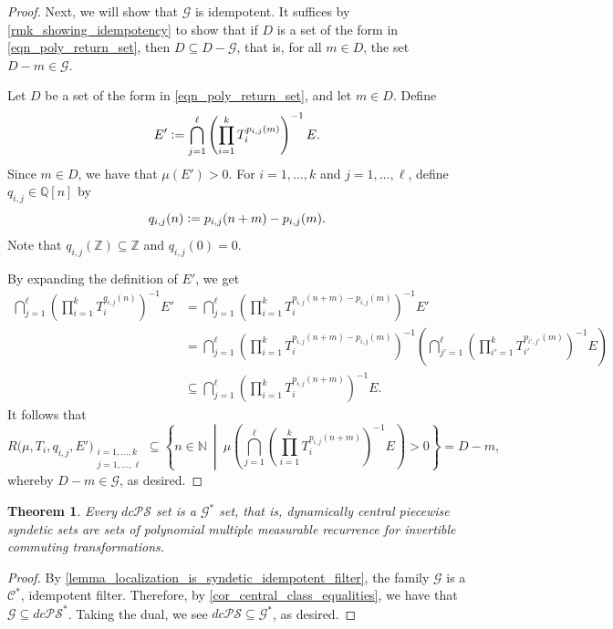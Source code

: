 \documentclass[letter,11pt]{article}
\theoremstyle{plain}
\newtheorem{theorem}{Theorem}
\theoremstyle{definition}
\theoremstyle{plain}
\theoremstyle{plain}
\numberwithin{equation}{section}
\newcommand{\N}{\mathbb{N}}
\newcommand{\Z}{\mathbb{Z}}
\newcommand{\Q}{\mathbb{Q}}
\newcommand{\defeq}{\vcentcolon=}
\newcommand{\dcPS}{dc\mathcal{PS}}
\newcommand{\central}{\mathcal{C}}
\newcommand{\filtertwo}{\mathscr{G}}
\newcommand{\familytwo}{\mathscr{G}}
\newcommand{\polyret}{R}
\begin{document}
\begin{proof}
    
    
    Next, we will show that $\filtertwo$ is idempotent. It suffices by \cref{rmk_showing_idempotency} to show that if $D$ is a set of the form in \eqref{eqn_poly_return_set}, then $D \subseteq D - \filtertwo$, that is, for all $m \in D$, the set $D-m \in \filtertwo$.
    
    Let $D$ be a set of the form in \eqref{eqn_poly_return_set}, and let $m \in D$.
    Define
    \[
        E' \defeq \bigcap_{j=1}^{\ell} \left( \prod_{i=1}^{k} T_i^{p_{i,j}(m)} \right)^{-1} E.
    \]
    Since $m \in D$, we have that $\mu(E') > 0$. For $i = 1, \ldots, k$ and $j = 1, \ldots, \ell$, define $q_{i,j} \in \Q[n]$ by
    \[
        q_{i,j}(n) \defeq p_{i,j}(n + m) - p_{i,j}(m).
    \]
    Note that $q_{i,j}(\Z) \subseteq \Z$ and $q_{i,j}(0) = 0$.

    By expanding the definition of $E'$, we get
    \begin{align*}
        \bigcap_{j=1}^{\ell} \left( \prod_{i=1}^{k} T_i^{q_{i,j}(n)} \right)^{-1} E' &= \bigcap_{j=1}^{\ell} \left( \prod_{i=1}^{k} T_i^{p_{i,j}(n+m) - p_{i,j}(m)} \right)^{-1} E' \\
        &= \bigcap_{j=1}^{\ell} \left( \prod_{i=1}^{k} T_i^{p_{i,j}(n+m) - p_{i,j}(m)} \right)^{-1} \left( \bigcap_{j'=1}^{\ell} \left( \prod_{i'=1}^{k} T_{i'}^{p_{i',j'}(m)} \right)^{-1} E \right) \\
        &\subseteq \bigcap_{j=1}^{\ell} \left( \prod_{i=1}^{k} T_i^{p_{i,j}(n+m)} \right)^{-1} E.
    \end{align*}
    It follows that
    \[
        \polyret \big(\mu, T_i, q_{i,j}, E' \big)_{\substack{i = 1, \ldots, k \\ j = 1, \ldots, \ell}} \subseteq \left\{n \in \N \ \middle | \ \mu \left( \bigcap_{j=1}^{\ell} \left( \prod_{i=1}^{k} T_i^{p_{i,j}(n+m)} \right)^{-1} E \right) > 0 \right\} = D - m,
    \]
    whereby $D-m \in \filtertwo$, as desired.
\end{proof}

\begin{theorem}
\label{thm_dcps_is_poly_mult_comm_rec}
    Every $\dcPS$ set is a $\filtertwo^*$ set, that is, dynamically central piecewise syndetic sets are sets of polynomial multiple measurable recurrence for invertible commuting transformations.
\end{theorem}

\begin{proof}
    By \cref{lemma_localization_is_syndetic_idempotent_filter}, the family $\familytwo$ is a $\central^*$, idempotent filter.  Therefore, by \cref{cor_central_class_equalities}, we have that $\familytwo \subseteq \dcPS^*$.  Taking the dual, we see $\dcPS \subseteq \familytwo^*$, as desired.
\end{proof}
\end{document}
